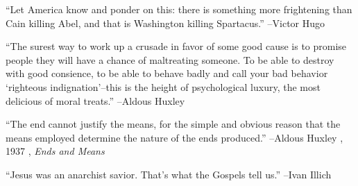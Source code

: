 \documentclass{article}%
\begin{document}
\linebreak%
\vspace{1mm}%
\begin{minipage}{\textwidth}%
\flushleft%
“Let America know and ponder on this: there is something more frightening than Cain killing Abel, and that is Washington killing Spartacus.”%
\linebreak%
\vspace{1mm}%
–Victor Hugo%
\linebreak%
\vspace{1mm}%
\end{minipage}%
\linebreak%
\vspace{1mm}%
\begin{minipage}{\textwidth}%
\flushleft%
“The surest way to work up a crusade in favor of some good cause is to promise people they will have a chance of maltreating someone. To be able to destroy with good consience, to be able to behave badly and call your bad behavior ‘righteous indignation’–this is the height of psychological luxury, the most delicious of moral treats.”%
\linebreak%
\vspace{1mm}%
–Aldous Huxley%
\linebreak%
\vspace{1mm}%
\end{minipage}%
\linebreak%
\vspace{1mm}%
\begin{minipage}{\textwidth}%
\flushleft%
“The end cannot justify the means, for the simple and obvious reason that the means employed determine the nature of the ends produced.”%
\linebreak%
\vspace{1mm}%
–Aldous Huxley%
, 1937%
, \textit{Ends and Means}%
\linebreak%
\vspace{1mm}%
\end{minipage}%
\linebreak%
\vspace{1mm}%
\begin{minipage}{\textwidth}%
\flushleft%
“Jesus was an anarchist savior. That's what the Gospels tell us.”%
\linebreak%
\vspace{1mm}%
–Ivan Illich%
\linebreak%
\vspace{1mm}%
\end{minipage}%
\end{document}
